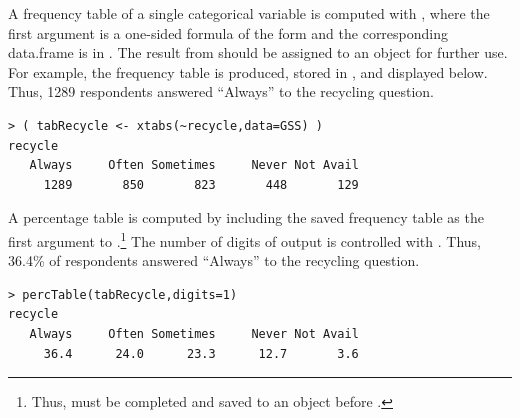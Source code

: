 \documentclass[10pt,openany]{book}\usepackage[]{graphicx}\usepackage[]{color}
\makeatletter
\newenvironment{kframe}{%
 \def\at@end@of@kframe{}%
 \ifinner\ifhmode%
  \def\at@end@of@kframe{\end{minipage}}%
  \begin{minipage}{\columnwidth}%
 \fi\fi%
 \def\FrameCommand##1{\hskip\@totalleftmargin \hskip-\fboxsep
 \colorbox{shadecolor}{##1}\hskip-\fboxsep
     \hskip-\linewidth \hskip-\@totalleftmargin \hskip\columnwidth}%
 \MakeFramed {\advance\hsize-\width
   \@totalleftmargin\z@ \linewidth\hsize
   \@setminipage}}%
 {\par\unskip\endMakeFramed%
 \at@end@of@kframe}
\newenvironment{knitrout}{}{} %
\makeatother
\begin{document}
A frequency table of a single categorical variable is computed with , where the first argument is a one-sided formula of the form  and the corresponding data.frame is in . The result from  should be assigned to an object for further use. For example, the frequency table is produced, stored in , and displayed below. Thus, 1289 respondents answered ``Always'' to the recycling question.
\begin{knitrout}
\color{fgcolor}\begin{kframe}
\begin{verbatim}
> ( tabRecycle <- xtabs(~recycle,data=GSS) )
recycle
   Always     Often Sometimes     Never Not Avail 
     1289       850       823       448       129 
\end{verbatim}
\end{kframe}
\end{knitrout}

A percentage table is computed by including the saved frequency table as the first argument to .\footnote{Thus,  must be completed and saved to an object before .} The number of digits of output is controlled with . Thus, 36.4\% of respondents answered ``Always'' to the recycling question.
\begin{knitrout}
\color{fgcolor}\begin{kframe}
\begin{verbatim}
> percTable(tabRecycle,digits=1)
recycle
   Always     Often Sometimes     Never Not Avail 
     36.4      24.0      23.3      12.7       3.6 
\end{verbatim}
\end{kframe}
\end{knitrout}
\end{document}
